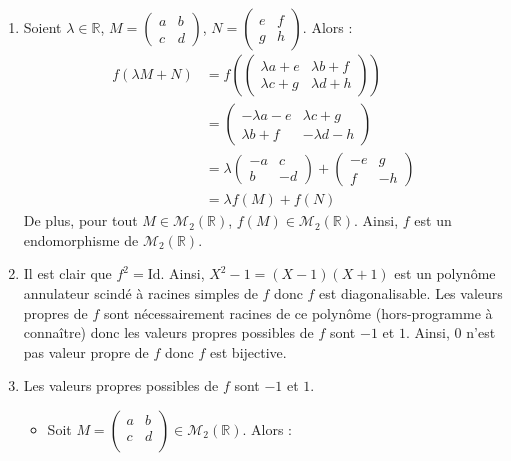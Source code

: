 \documentclass[a4paper,twoside,french,10pt]{VcCours}
\begin{document}
\begin{enumerate}
\item Soient $\lambda \in \mathbb{R}$, $M = \begin{pmatrix}
a & b \\
c & d 
\end{pmatrix}$, $N = \begin{pmatrix}
e & f \\
g & h 
\end{pmatrix}$. Alors :
\begin{align*}
f( \lambda M+N) & = f \left( \begin{pmatrix}
\lambda a + e &\lambda b + f \\
 \lambda c + g &\lambda d + h
\end{pmatrix} \right) \\
& = \begin{pmatrix}
-\lambda a - e &\lambda c + g \\
  \lambda b + f&-\lambda d - h
\end{pmatrix} \\
& =  \lambda  \begin{pmatrix}
-a & c \\
b & -d 
\end{pmatrix} + \begin{pmatrix}
-e & g \\
f & -h 
\end{pmatrix} \\
& = \lambda f(M)+f(N)
\end{align*}
De plus, pour tout $M \in \mathcal{M}_2(\mathbb{R})$, $f(M) \in \mathcal{M}_2(\mathbb{R})$. Ainsi, $f$ est un endomorphisme de $\mathcal{M}_2(\mathbb{R})$.
\item Il est clair que $f^2 = \textrm{Id}$. Ainsi, $X^2-1= (X-1)(X+1)$ est un polynôme annulateur scindé à racines simples de $f$ donc $f$ est diagonalisable. Les valeurs propres de $f$ sont nécessairement racines de ce polynôme (hors-programme à connaître) donc les valeurs propres possibles de $f$ sont $-1$ et $1$. Ainsi, $0$ n'est pas valeur propre de $f$ donc $f$ est bijective.
\item Les valeurs propres possibles de $f$ sont $-1$ et $1$.
\begin{itemize}
\item Soit $M= \begin{pmatrix}
a&b \\
c & d \\
\end{pmatrix} \in \mathcal{M}_2(\mathbb{R})$. Alors :

\end{itemize}
\end{enumerate}
\end{document}
